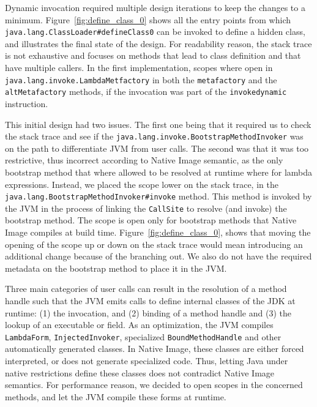 Dynamic invocation required multiple design iterations to keep the changes to a minimum. Figure~\ref{fig:define_class_0} shows all the entry points from which \verb|java.lang.ClassLoader#defineClass0| can be invoked to define a hidden class, and illustrates the final state of the design. For readability reason, the stack trace is not exhaustive and focuses on methods that lead to class definition and that have multiple callers.   
In the first implementation, scopes where open in \verb|java.lang.invoke.LambdaMetfactory| in both the \verb|metafactory| and the \verb|altMetafactory| methods, if the invocation was part of the \verb|invokedynamic| instruction.

This initial design had two issues. The first one being that it required us to check the stack trace and see if the \verb|java.lang.invoke.BootstrapMethodInvoker| was on the path to differentiate JVM from user calls. The second was that it was too restrictive, thus incorrect according to Native Image semantic, as the only bootstrap method that where allowed to be resolved at runtime where for lambda expressions.
Instead, we placed the scope lower on the stack trace, in the \verb|java.lang.BootstrapMethodInvoker#invoke| method. This method is invoked by the JVM in the process of linking the \verb|CallSite| to resolve (and invoke) the bootstrap method. The scope is open only for bootstrap methods that Native Image compiles at build time.
Figure~\ref{fig:define_class_0}, shows that moving the opening of the scope up or down on the stack trace would mean introducing an additional change because of the branching out. We also do not have the required metadata on the bootstrap method to place it in the JVM.   

Three main categories of user calls can result in the resolution of a method handle such that the JVM emits calls to define internal classes of the JDK at runtime: (1) the invocation, and (2) binding of a method handle and (3) the lookup of an executable or field. As an optimization, the JVM compiles \verb|LambdaForm|, \verb|InjectedInvoker|, specialized \verb|BoundMethodHandle| and other automatically generated classes. 
In Native Image, these classes are either forced interpreted, or does not generate specialized code. Thus, letting Java under native restrictions define these classes does not contradict Native Image semantics. For performance reason, we decided to open scopes in the concerned methods, and let the JVM compile these forms at runtime.

